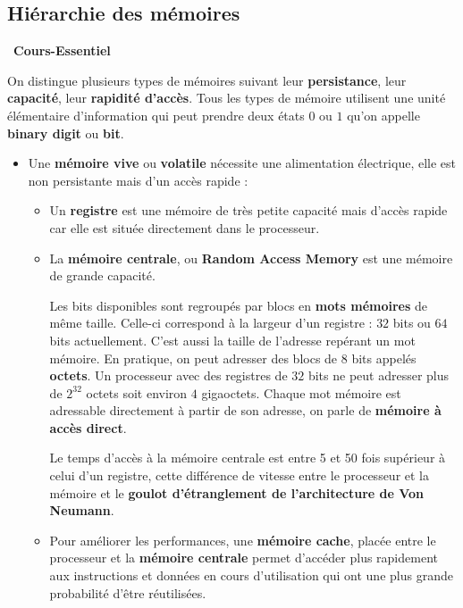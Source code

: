 \documentclass[a4paper, french, 11pt]{article}  %
\newcounter{cours}
\newenvironment{cours}[1]
{\par \medskip   \addtocounter{cours}{1} \noindent  
\begin{bclogo}[arrondi =0.1,  ombre = true, barre=none, logo=\bcbook, marge=4]{~\textbf{Cours-Essentiel} \textbf{\thecours} {\itshape #1} }  \par}
{
\end{bclogo}
 \par \bigskip }
\begin{document}
\subsection{Hiérarchie des mémoires}






\begin{cours}{}

On distingue plusieurs types de mémoires suivant leur \textbf{persistance}, leur \textbf{capacité}, leur \textbf{rapidité d'accès}.  Tous les types de mémoire utilisent une unité élémentaire d'information qui peut prendre deux états $0$ ou $1$ qu'on appelle \textbf{binary digit} ou \textbf{bit}.

\begin{itemize}[label=]

	\item Une \textbf{mémoire vive} ou \textbf{volatile} nécessite une alimentation électrique, elle est non persistante mais d'un accès rapide :
	
	\begin{itemize}
		\item Un \textbf{registre} est une mémoire de très petite capacité mais d'accès rapide car elle est  située directement dans le processeur.
		\item La \textbf{mémoire centrale}, ou \textbf{Random Access Memory} est une mémoire de grande capacité. 
		
		
Les bits disponibles sont regroupés par blocs en \textbf{mots mémoires} de même taille. Celle-ci correspond à la largeur d'un registre : $32$ bits ou $64$ bits actuellement. C'est aussi la taille de l'adresse repérant un mot mémoire. En pratique, on peut adresser des blocs de $8$ bits appelés \textbf{octets}.  Un processeur avec des registres de  $32$ bits ne peut adresser plus de $2^{32}$ octets soit environ $4$ gigaoctets.  Chaque mot mémoire est adressable directement à partir de son adresse, on parle de \textbf{mémoire à accès direct}. 
		
		Le temps d'accès à la mémoire centrale est entre 5 et 50 fois supérieur à celui d'un registre, cette différence de vitesse entre le processeur et la mémoire et le \textbf{goulot d'étranglement de l'architecture de Von Neumann}. 
		

		\item Pour améliorer les performances, une \textbf{mémoire cache}, placée entre le processeur et la \textbf{mémoire centrale} permet d'accéder plus rapidement aux instructions et données en cours d'utilisation qui ont une plus grande probabilité d'être réutilisées.
	\end{itemize}


\end{itemize}
\end{cours}
\end{document}
